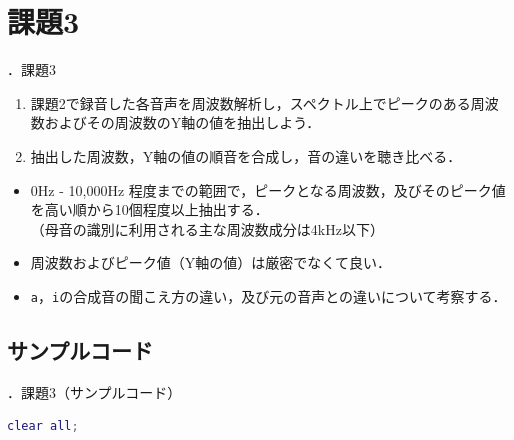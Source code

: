 \documentclass[aspectratio=43]{beamer}
\newcommand{\showsec}{\thesection ．}
\begin{document}
\section{課題3}
\begin{frame}[t]{\showsec 課題3}
    \begin{exampleblock}{}
        \begin{enumerate}
            \item 課題2で録音した各音声を周波数解析し，スペクトル上でピークのある周波数およびその周波数のY軸の値を抽出しよう．
            \item 抽出した周波数，Y軸の値の順音を合成し，音の違いを聴き比べる．
        \end{enumerate}
    \end{exampleblock}
    \dotfill
    \begin{itemize}
        \item 0Hz - 10,000Hz 程度までの範囲で，ピークとなる周波数，及びそのピーク値を高い順から10個程度以上抽出する．\\
              （母音の識別に利用される主な周波数成分は4kHz以下）
        \item 周波数およびピーク値（Y軸の値）は厳密でなくて良い．
        \item \texttt{a}，\texttt{i}の合成音の聞こえ方の違い，及び元の音声との違いについて考察する．
    \end{itemize}
\end{frame}
\subsection{サンプルコード}
\begin{frame}[t,containsverbatim]{\showsec 課題3（サンプルコード）}
    \begin{lstlisting}[language=Matlab]
clear all;

\end{lstlisting}
\end{frame}
\end{document}
